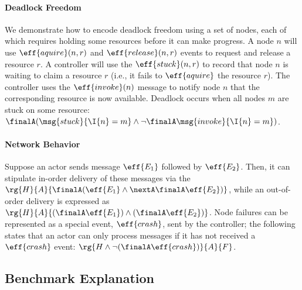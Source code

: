 \paragraph{Deadlock Freedom}

We demonstrate how to encode deadlock freedom using a set of nodes,
each of which requires holding some resources before it can make
progress. A node \( n \) will use \(\eff{aquire}(n, r)\) and
\(\eff{release}(n, r)\) events to request and release a resource
\( r \). A controller will use the \(\eff{stuck}(n, r)\) to record
that node \( n \) is waiting to claim a resource \( r \) (i.e., it
fails to \(\eff{aquire}\) the resource \( r \)). The controller uses
the \(\eff{invoke}(n)\) message to notify node \( n \) that the
corresponding resource is now available. Deadlock occurs when all
nodes \( m \) are stuck on some resource:
{\small\(\finalA (\msg{stuck}{\I{n} = m} \land
  \neg\finalA\msg{invoke}{\I{n} = m})\)}.

\paragraph{Network Behavior}
Suppose an actor sends message \(\eff{E_1}\) followed by
\(\eff{E_2}\). Then, it can stipulate in-order delivery of these
messages via the \PAT{} {\small\(\rg{H}{A}{\finalA (\eff{E_1} \land \nextA \finalA
    \eff{E_2})}\)}, while an out-of-order delivery is expressed as
{\small\(\rg{H}{A}{(\finalA \eff{E_1}) \land (\finalA \eff{E_2})}\)}.
Node failures can be represented as a special event, \(\eff{crash}\),
sent by the controller; the following \PAT{} states that an actor can
only process messages if it has not received a \(\eff{crash}\) event:
{\small\(\rg{H \land \neg (\finalA \eff{crash})}{A}{F}\)}.

\subsection{Benchmark Explanation}

